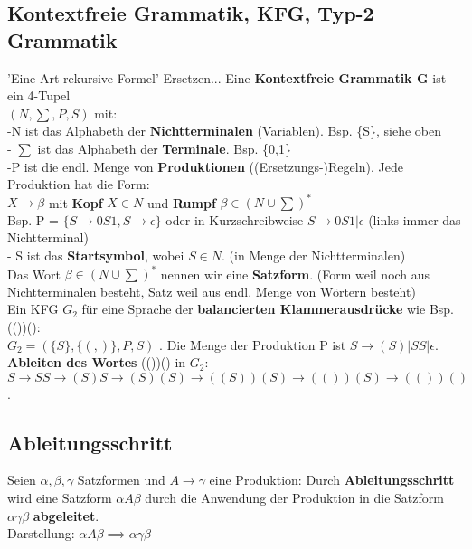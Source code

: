 \subsection{Kontextfreie Grammatik, KFG, Typ-2 Grammatik}
'Eine Art rekursive Formel'-Ersetzen... Eine \textbf{Kontextfreie Grammatik G} ist ein 4-Tupel\\
$(N,\sum, P, S)$ mit:\\
-N ist das Alphabeth der \textbf{Nichtterminalen} (Variablen). Bsp. \{S\}, siehe oben \\ 
- $\sum$ ist das Alphabeth der \textbf{Terminale}. Bsp. \{0,1\}\\ 
-P ist die endl. Menge von \textbf{Produktionen} ((Ersetzungs-)Regeln). Jede Produktion hat die Form:\\
$ X \rightarrow \beta $ mit \textbf{Kopf} $X \in N$ und \textbf{Rumpf}  $ \beta \in ( N \cup \sum)^*$ \\
Bsp. P = $\{S \rightarrow0S1,S \rightarrow \epsilon\}$ oder in Kurzschreibweise $S \rightarrow 0S1 | \epsilon $ (links immer das Nichtterminal)\\
- S ist das \textbf{Startsymbol}, wobei $S \in N$. (in Menge der Nichtterminalen)\\

Das Wort $ \beta \in ( N \cup \sum)^*$ nennen wir eine \textbf{Satzform}. (Form weil noch aus Nichtterminalen besteht, Satz weil aus endl. Menge von Wörtern besteht)\\

Ein KFG $G_2$ für eine Sprache der \textbf{balancierten Klammerausdrücke} wie Bsp. (())():\\
$G_2 = (\{S\},\{(,)\},P,S)$ . Die Menge der Produktion P ist $S \rightarrow (S) | SS | \epsilon $. \\   
\textbf{Ableiten des Wortes} (())() in $G_2$: \\
$S \rightarrow SS \rightarrow (S)S \rightarrow (S)(S) \rightarrow((S))(S)\rightarrow(())(S) \rightarrow (())()$.

\subsection*{Ableitungsschritt}
Seien $\alpha , \beta , \gamma$ Satzformen und $A \rightarrow \gamma$ eine Produktion: Durch \textbf{Ableitungsschritt} wird eine Satzform $\alpha A \beta$ durch die Anwendung der Produktion in die Satzform $\alpha\gamma\beta$ \textbf{abgeleitet}.\\
Darstellung: $\alpha A \beta \implies \alpha\gamma\beta$ \\

